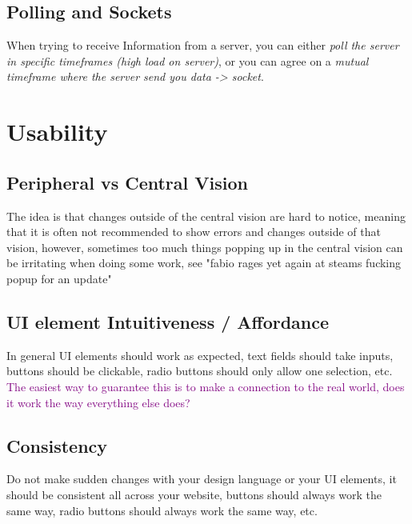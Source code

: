 \documentclass[main.tex,fontsize=6pt,paper=a4,paper=landscape,DIV=calc,]{scrartcl}
\begin{document}
\begin{multicols*}{4}
\subsection{Polling and Sockets}
When trying to receive Information from a server, you can either \emph{poll the server in specific timeframes (high load on server)}, or you can agree on a \emph{mutual timeframe where the server send you data -> socket}.

\section{Usability}

\subsection{Peripheral vs Central Vision}  
The idea is that changes outside of the central vision are hard to notice, meaning that it is often not recommended to show errors and changes outside of that vision, however, sometimes too much things popping up in the central vision can be irritating when doing some work, see "fabio rages yet again at steams fucking popup for an update"\newline

\subsection{UI element Intuitiveness / Affordance}  
In general UI elements should work as expected, text fields should take inputs, buttons should be clickable, radio buttons should only allow one selection, etc.\newline
\textcolor{purple}{The easiest way to guarantee this is to make a connection to the real world, does it work the way everything else does?}

\subsection{Consistency}  
Do not make sudden changes with your design language or your UI elements, it should be consistent all across your website, buttons should always work the same way, radio buttons should always work the same way, etc.


\end{multicols*}
\end{document}
